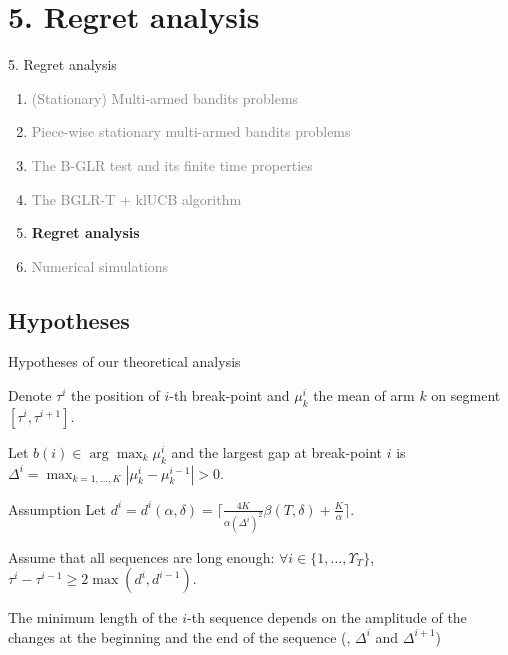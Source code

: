 \documentclass[11pt,english,ignorenonframetext,]{beamer}
\begin{document}
\section{\hfill{}5. Regret analysis\hfill{}}

\begin{frame}{5. Regret analysis}

  \begin{enumerate}
    \item
    \textcolor{gray}{
      (Stationary) Multi-armed bandits problems
    }
    \vspace*{15pt}

    \item
    \textcolor{gray}{
      Piece-wise stationary multi-armed bandits problems
    }
    \vspace*{15pt}

    \item
    \textcolor{gray}{
      The B-GLR test and its finite time properties
    }
    \vspace*{15pt}

    \item
    \textcolor{gray}{
      The BGLR-T + klUCB algorithm
    }
    \vspace*{15pt}

    \item
    \alert{\textbf{%
      Regret analysis
    }}
    \vspace*{15pt}

    \item
    \textcolor{gray}{
      Numerical simulations
    }
  \end{enumerate}

\end{frame}

\subsection{\hfill{}Hypotheses\hfill{}}

\begin{frame}{Hypotheses of our theoretical analysis}

  Denote $\tau^{i}$ the position of $i$-th break-point
  and $\mu_k^{i}$ the mean of arm $k$ on segment $[\tau^i, \tau^{i+1}]$.

  Let $b(i) \in \arg\max_k \mu_k^{i} $
  and the largest gap at break-point $i$ is
  $\Delta^{i} = \max_{k=1,\dots,K} |\mu_k^{i} - \mu_k^{i-1}| >0$.

  \begin{block}{Assumption}
    Let $d^{i} = d^{i}(\alpha,\delta) = \lceil \frac{4K}{\alpha(\Delta^{i})^2}\beta(T,\delta) + \frac{K}{\alpha} \rceil$.

    Assume that all sequences are long enough:
    $\forall i \in \{1,\dots,\Upsilon_T\}$, $\tau^{i} - \tau^{i-1} \geq 2\max( d^{i}, d^{i-1} )$.
  \end{block}

  The minimum length of the $i$-th sequence depends on the amplitude of the changes at the beginning and the end of the sequence (\ie, $\Delta^i$ and $\Delta^{i+1}$)

\end{frame}
\end{document}
